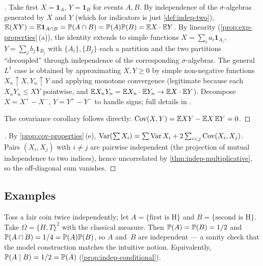 \begin{proof}[]
Take first $X = \mathbf{1}_A$, $Y = \mathbf{1}_B$ for events
$A, B$. By independence of the $\sigma$-algebras
generated by $X$ and $Y$ (which for indicators is just
\cref{def:indep-two}), $\mathbb{E}(XY) = \mathbb{E} \mathbf{1}_{A \cap B} = \mathbb{P}(A \cap B) = \mathbb{P}(A) \mathbb{P}(B) = \mathbb{E} X \cdot \mathbb{E} Y$.
By linearity (\cref{prop:exp-properties}\,(a)), the identity extends
to simple functions
$X = \sum_{i} a_i \mathbf{1}_{A_i}$, $Y = \sum_{j} b_j \mathbf{1}_{B_j}$
with $\{A_i\}, \{B_j\}$ each a partition and the two partitions
``decoupled'' through independence of the corresponding
$\sigma$-algebras. The general $L^1$ case is obtained by approximating
$X, Y \geq 0$ by simple non-negative functions
$X_n \uparrow X, Y_n \uparrow Y$ and applying monotone convergence
(legitimate because each $X_n Y_n \leq XY$ pointwise, and
$\mathbb{E} X_n Y_n = \mathbb{E} X_n \cdot \mathbb{E} Y_n \to \mathbb{E} X \cdot \mathbb{E} Y$). Decompose
$X = X^+ - X^-$, $Y = Y^+ - Y^-$ to handle signs; full details
in \cite[Ch.~II, \S~6]{Shiryaev1989}.

The covariance corollary follows directly:
$\operatorname{Cov}(X, Y) = \mathbb{E} XY - \mathbb{E} X\, \mathbb{E} Y = 0$.
\end{proof}

\begin{proof}[]
By \cref{prop:cov-properties}\,(e),
$\operatorname{Var}(\sum X_i) = \sum \operatorname{Var} X_i + 2 \sum_{i < j} \operatorname{Cov}(X_i, X_j)$.
Pairs $(X_i, X_j)$ with $i \neq j$ are pairwise independent (the
projection of mutual independence to two indices), hence
uncorrelated by \cref{thm:indep-multiplicative}, so the off-diagonal
sum vanishes.
\end{proof}

\subsection*{Examples}

\begin{example}
\label{ex:two-coins}
Toss a fair coin twice independently; let $A = \{\text{first is H}\}$
and $B = \{\text{second is H}\}$. Take $\Omega = \{H, T\}^2$ with the
classical measure. Then $\mathbb{P}(A) = \mathbb{P}(B) = 1/2$ and
$\mathbb{P}(A \cap B) = 1/4 = \mathbb{P}(A) \mathbb{P}(B)$, so $A$ and~$B$ are
independent — a sanity check that the model construction matches the
intuitive notion. Equivalently, $\mathbb{P}(A \mid B) = 1/2 = \mathbb{P}(A)$
(\cref{prop:indep-conditional}).
\end{example}

